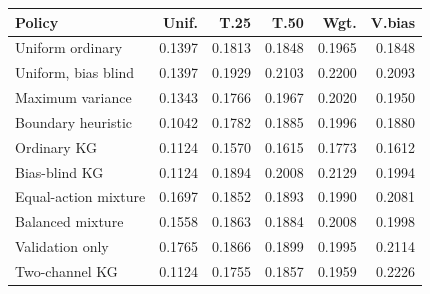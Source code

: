 \begin{tabular}{lrrrrr}
\toprule
Policy & Unif. & T.25 & T.50 & Wgt. & V.bias \\
\midrule
Uniform ordinary & 0.1397 & 0.1813 & 0.1848 & 0.1965 & 0.1848 \\
Uniform, bias blind & 0.1397 & 0.1929 & 0.2103 & 0.2200 & 0.2093 \\
Maximum variance & 0.1343 & 0.1766 & 0.1967 & 0.2020 & 0.1950 \\
Boundary heuristic & 0.1042 & 0.1782 & 0.1885 & 0.1996 & 0.1880 \\
Ordinary KG & 0.1124 & 0.1570 & 0.1615 & 0.1773 & 0.1612 \\
Bias-blind KG & 0.1124 & 0.1894 & 0.2008 & 0.2129 & 0.1994 \\
Equal-action mixture & 0.1697 & 0.1852 & 0.1893 & 0.1990 & 0.2081 \\
Balanced mixture & 0.1558 & 0.1863 & 0.1884 & 0.2008 & 0.1998 \\
Validation only & 0.1765 & 0.1866 & 0.1899 & 0.1995 & 0.2114 \\
Two-channel KG & 0.1124 & 0.1755 & 0.1857 & 0.1959 & 0.2226 \\
\bottomrule
\end{tabular}
